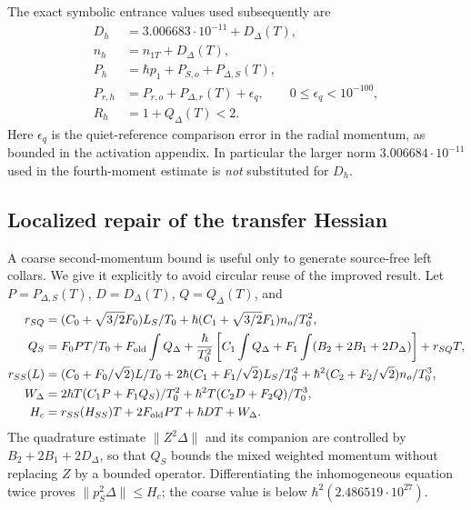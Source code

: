 \documentclass[11pt]{article}
\theoremstyle{definition}\newtheorem{definition}[theorem]{Definition}
\theoremstyle{remark}\newtheorem{remark}[theorem]{Remark}
\begin{document}
The exact symbolic entrance values used subsequently are
\begin{align}
 D_h&=3.006683\cdot10^{-11}+D_\Delta(T),\\
 n_h&=n_{1T}+D_\Delta(T),\\
 P_h&=\hbar p_1+P_{S,o}+P_{\Delta,S}(T),\\
 P_{r,h}&=P_{r,o}+P_{\Delta,r}(T)+\epsilon_q,
 \qquad 0\le\epsilon_q<10^{-100},\\
 R_h&=1+Q_\Delta(T)<2. \label{prep:new-handoff}
\end{align}
Here $\epsilon_q$ is the quiet-reference comparison error in the radial
momentum, as bounded in the activation appendix. In particular the
larger norm $3.006684\cdot10^{-11}$ used in the fourth-moment
estimate is \emph{not} substituted for $D_h$.

\subsection{Localized repair of the transfer Hessian}
\label{prep:transfer-hessian}
A coarse second-momentum bound is useful only to generate source-free
left collars. We give it explicitly to avoid circular reuse of the
improved result. Let $P=P_{\Delta,S}(T)$, $D=D_\Delta(T)$,
$Q=Q_\Delta(T)$, and
\begin{align*}
 r_{SQ}&=(C_0+\sqrt{3/2}F_0)L_S/T_0
             +\hbar(C_1+\sqrt{3/2}F_1)n_o/T_0^2,\\
 Q_S&=F_0PT/T_0+F_{\rm old}\int Q_\Delta
       +\frac\hbar{T_0^2}\left[C_1\int Q_\Delta
                  +F_1\int(B_2+2B_1+2D_\Delta)\right]+r_{SQ}T,\\
 r_{SS}(L)&=(C_0+F_0/\sqrt2)L/T_0
       +2\hbar(C_1+F_1/\sqrt2)L_S/T_0^2
       +\hbar^2(C_2+F_2/\sqrt2)n_o/T_0^3,\\
 W_\Delta&=2\hbar T(C_1P+F_1Q_S)/T_0^2
                    +\hbar^2T(C_2D+F_2Q)/T_0^3,\\
 H_c&=r_{SS}(H_{SS})T+2F_{\rm old}PT+\hbar DT+W_\Delta.
\end{align*}
The quadrature estimate $\|Z^2\Delta\|$ and its companion are
controlled by $B_2+2B_1+2D_\Delta$, so that $Q_S$ bounds the
mixed weighted momentum without replacing $Z$ by a bounded operator.
Differentiating the inhomogeneous equation twice proves
$\|p_S^2\Delta\|\le H_c$; the coarse value is below
$\hbar^2(2.486519\cdot10^{27})$.
\end{document}
